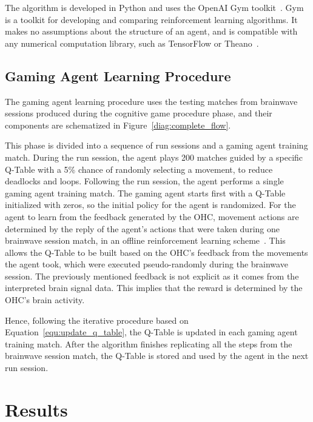 \documentclass[journal]{IEEEtran}
\begin{document}
{{The algorithm is developed in Python and uses the OpenAI Gym toolkit~\cite{openai}. Gym is a toolkit for developing and comparing reinforcement learning algorithms. It makes no assumptions about the structure of an agent, and is compatible with any numerical computation library, such as TensorFlow or Theano~\cite{tensorflow2015-whitepaper}.

\subsection{Gaming Agent Learning Procedure}
\label{q_learning_step_alg}

The gaming agent learning procedure uses the testing matches from brainwave sessions produced during the cognitive game procedure phase, and their components are schematized in Figure~\ref{diag:complete_flow}.

This phase is divided into a sequence of run sessions and a gaming agent training match.  During the run session, the agent plays 200 matches guided by a specific Q-Table with a 5\% chance of randomly selecting a movement, to reduce deadlocks and loops.  Following the run session, the agent performs a single gaming agent training match.  The gaming agent starts first with a Q-Table initialized with zeros, so the initial policy for the agent is randomized.  For the agent to learn from the feedback generated by the OHC, movement actions are determined by the reply of the agent's actions that were taken during one brainwave session match, in an offline reinforcement learning scheme~\cite{Levine2020}. This allows the Q-Table to be built based on the OHC's feedback from the movements the agent took, which were executed pseudo-randomly during the brainwave session.  The previously mentioned feedback is not explicit as it comes from the interpreted brain signal data. This implies that the reward is determined by the OHC's brain activity.

Hence, following the iterative procedure based on Equation~\ref{equ:update_q_table}, the Q-Table is updated in each gaming agent training match. After the algorithm finishes replicating all the steps from the brainwave session match, the Q-Table is stored and used by the agent in the next run session.


\section{Results}
\label{results}



}}
\end{document}
